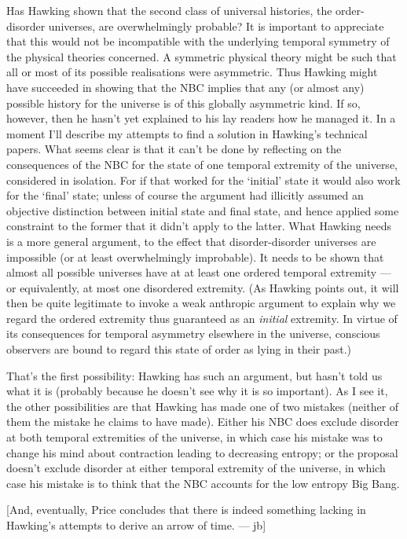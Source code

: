 \documentclass{article}
\begin{document}
Has Hawking shown that the second class of universal histories, the
order-disorder universes, are overwhelmingly probable? It is important
to appreciate that this would not be incompatible with the underlying
temporal symmetry of the physical theories concerned. A symmetric
physical theory might be such that all or most of its possible
realisations were asymmetric. Thus Hawking might have succeeded in
showing that the NBC implies that any (or almost any) possible history
for the universe is of this globally asymmetric kind. If so, however,
then he hasn't yet explained to his lay readers how he managed it. In a
moment I'll describe my attempts to find a solution in Hawking's
technical papers. What seems clear is that it can't be done by
reflecting on the consequences of the NBC for the state of one temporal
extremity of the universe, considered in isolation. For if that worked
for the `initial' state it would also work for the `final' state; unless
of course the argument had illicitly assumed an objective distinction
between initial state and final state, and hence applied some constraint
to the former that it didn't apply to the latter. What Hawking needs is
a more general argument, to the effect that disorder-disorder universes
are impossible (or at least overwhelmingly improbable). It needs to be
shown that almost all possible universes have at at least one ordered
temporal extremity --- or equivalently, at most one disordered
extremity. (As Hawking points out, it will then be quite legitimate to
invoke a weak anthropic argument to explain why we regard the ordered
extremity thus guaranteed as an \emph{initial} extremity. In virtue of
its consequences for temporal asymmetry elsewhere in the universe,
conscious observers are bound to regard this state of order as lying in
their past.)

That's the first possibility: Hawking has such an argument, but hasn't
told us what it is (probably because he doesn't see why it is so
important). As I see it, the other possibilities are that Hawking has
made one of two mistakes (neither of them the mistake he claims to have
made). Either his NBC does exclude disorder at both temporal extremities
of the universe, in which case his mistake was to change his mind about
contraction leading to decreasing entropy; or the proposal doesn't
exclude disorder at either temporal extremity of the universe, in which
case his mistake is to think that the NBC accounts for the low entropy
Big Bang.

{[}And, eventually, Price concludes that there is indeed something
lacking in Hawking's attempts to derive an arrow of time. --- jb{]}
\end{document}
